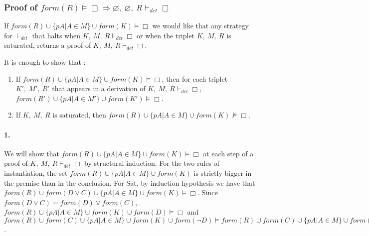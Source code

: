 \documentclass[a4paper,10pt]{report}
\newcommand{\dett}{\vdash_\mathit{det}}
\newcommand{\F}{\mathit{form}}
\begin{document}
\subsubsection*{Proof of $\F(R)\vDash\Box\Rightarrow\varnothing,\ \varnothing,\ R\dett\Box$}
If $\F(R)\cup\{pA|A\in M\}\cup\F(K)\vDash\Box$ we would like that any strategy for $\dett$
that halts when $K,\ M,\ R\dett\Box$ or when the triplet $K,\ M,\ R$ is saturated, returns
a proof of $K,\ M,\ R\dett\Box$.

It is enough to show that :
\begin{enumerate}
 \item If $\F(R)\cup\{pA|A\in M\}\cup\F(K)\vDash\Box$, then for each triplet $K',\ M',\ R'$
that appears in a derivation of $K,\ M,\ R\dett\Box$, $\F(R')\cup\{pA|A\in M'\}\cup\F(K')\vDash\Box$.
 \item If $K,\ M,\ R$ is saturated, then $\F(R)\cup\{pA|A\in M\}\cup\F(K)\nvDash\Box$.
\end{enumerate}
\paragraph{1.} 
We will show that $\F(R)\cup\{pA|A\in M\}\cup\F(K)\vDash\Box$ at each step of a proof of
$K,\ M,\ R\dett\Box$ by structural induction. For the two rules of instantiation, the set
$\F(R)\cup\{pA|A\in M\}\cup\F(K)$ is strictly bigger in the premise than in the conclusion.
For {\sc Sat}, by induction hypothesis we have that
$\F(R)\cup\F(D\vee C)\cup\{pA|A\in M\}\cup\F(K)\vDash\Box$. Since $\F(D\vee C)=\F(D)\vee\F(C)$,
$\F(R)\cup\{pA|A\in M\}\cup\F(K)\cup\F(D)\vDash\Box$ and
$\F(R)\cup\F(C)\cup\{pA|A\in M\}\cup\F(K)\cup\F(\neg D)\vDash
\F(R)\cup\F(C)\cup\{pA|A\in M\}\cup\F(K)\vDash\Box$.
\end{document}
